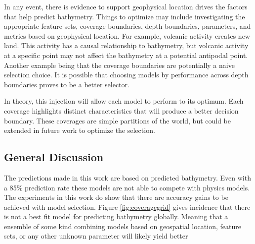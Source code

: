 
\par
In any event, there is evidence to support geophysical location drives the factors that help predict bathymetry.
Things to optimize may include investigating the appropriate feature sets, coverage boundaries, depth boundaries, parameters, and metrics based on geophysical location.
For example, volcanic activity creates new land.
This activity has a causal relationship to bathymetry, but volcanic activity at a specific point may not affect the bathymetry at a potential antipodal point.
Another example being that the coverage boundaries are potentially a naive selection choice.
It is possible that choosing models by performance across depth boundaries proves to be a better selector.
\par
In theory, this injection will allow each model to perform to its optimum.
Each coverage highlights distinct characteristics that will produce a better decision boundary.
These coverages are simple partitions of the world, but could be extended in future work to optimize the selection.




\subsection{General Discussion}
The predictions made in this work are based on predicted bathymetry.
Even with a 85\% prediction rate these models are not able to compete with physics models.
The experiments in this work do show that there are accuracy gains to be achieved with model selection.
Figure \ref{fig:coveragegrid} gives incidence that there is not a best fit model for predicting bathymetry globally.
Meaning that a ensemble of some kind combining models based on geospatial location, feature sets, or any other unknown parameter will likely yield better